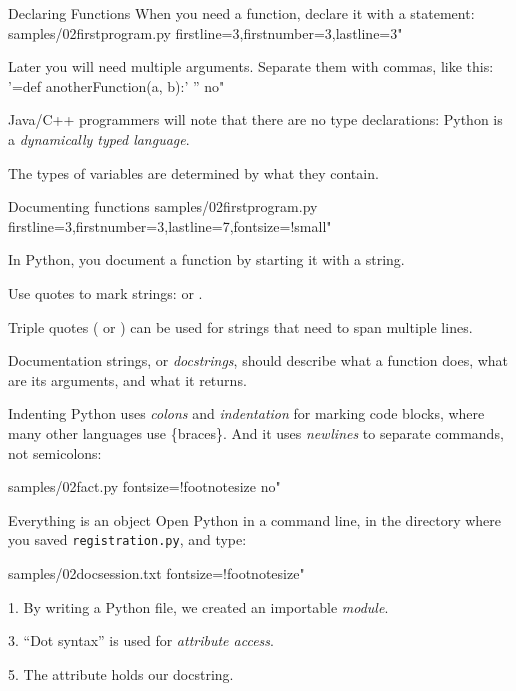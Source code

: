 \documentclass{pyslides}
\begin{document}
\begin{frame}[fragile]{Declaring Functions}
When you need a function, declare it with a  statement:
 samples/02firstprogram.py firstline=3,firstnumber=3,lastline=3"

\bigskip

Later you will need multiple arguments. Separate them with commas, like this:
 '=def anotherFunction(a, b):' '' no"

\bigskip

Java/C++ programmers will
note that there are no type declarations: Python is a \emph{dynamically typed language}.

The types of variables are determined by what they contain.
\end{frame}

\begin{frame}[fragile]{Documenting functions}
 samples/02firstprogram.py firstline=3,firstnumber=3,lastline=7,fontsize=!small"

In Python, you document a function by starting it with a string.

\bigskip

Use quotes to mark strings:  or
.

Triple quotes ( or )
can be used for strings that need to span multiple lines.

\bigskip

Documentation strings, or \emph{docstrings}, should describe what a function does,
what are its arguments, and what it returns.
\end{frame}

\begin{frame}[fragile]{Indenting}
Python uses \emph{colons} and \emph{indentation} for marking code blocks, where
many other languages use \{braces\}. And it uses \emph{newlines} to separate
commands, not semicolons:

 samples/02fact.py fontsize=!footnotesize no"

\end{frame}

\begin{frame}[fragile]{Everything is an object}
Open Python in a command line, in the directory where you saved \texttt{registration.py}, and type:

 samples/02docsession.txt fontsize=!footnotesize"

\bigskip

1. By writing a Python file, we created an importable \emph{module}.

3. “Dot syntax” is used for \emph{attribute access}.

5. The  attribute holds our docstring.
\end{frame}
\end{document}
